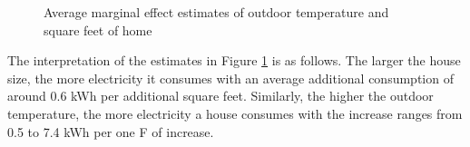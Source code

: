 \documentclass{article}
\begin{document}
\begin{enumerate}
\begin{enumerate}
\begin{figure}[H]
        \caption{Average marginal effect estimates of outdoor temperature and square feet of home}
        \label{f1:ame}
    \end{figure}
    The interpretation of the estimates in Figure \ref{f1:ame} is as follows. The larger the house size, the more electricity it consumes with an average additional consumption of around 0.6 kWh per additional square feet. Similarly, the higher the outdoor temperature, the more electricity a house consumes with the increase ranges from 0.5 to 7.4 kWh per one \textdegree F of increase.
\end{enumerate}


\end{enumerate}
\end{document}
